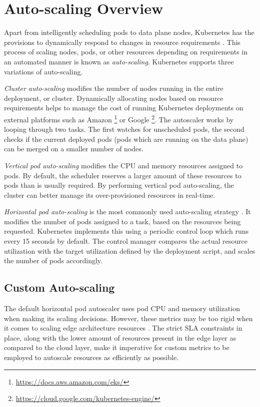 \section{Auto-scaling Overview}
\label{sec:ch2-auto-scaling}

Apart from intelligently scheduling pods to data plane nodes, Kubernetes has the provisions to dynamically respond to changes in resource requirements \cite{kayal2020kubernetes}. This process of scaling nodes, pods, or other resources depending on requirements in an automated manner is known as \textit{auto-scaling}. Kubernetes supports three variations of auto-scaling.\par

\textit{Cluster auto-scaling} modifies the number of nodes running in the entire deployment, or cluster. Dynamically allocating nodes based on resource requirements helps to manage the cost of running Kubernetes deployments on external platforms such as Amazon \footnote{\url{https://docs.aws.amazon.com/eks/}} or Google \footnote{\url{https://cloud.google.com/kubernetes-engine/}}. The autoscaler works by looping through two tasks. The first watches for unscheduled pods, the second checks if the current deployed pods (pods which are running on the data plane) can be merged on a smaller number of nodes.\par

\textit{Vertical pod auto-scaling} modifies the CPU and memory resources assigned to pods. By default, the scheduler reserves a larger amount of these resources to pods than is usually required. By performing vertical pod auto-scaling, the cluster can better manage its over-provisioned resources in real-time.\par

\textit{Horizontal pod auto-scaling} is the most commonly used auto-scaling strategy \cite{baresi2021kosmos}. It modifies the number of pods assigned to a task, based on the resources being requested. Kubernetes implements this using a periodic control loop which runs every 15 seconds by default. The control manager compares the actual resource utilization with the target utilization defined by the deployment script, and scales the number of pods accordingly.

\subsection{Custom Auto-scaling}
\label{subsec:ch2-custom-auto-scaling}

The default horizontal pod autoscaler uses pod CPU and memory utilization when making its scaling decisions. However, these metrics may be too rigid when it comes to scaling edge architecture resources \cite{coulson2020adaptive}. The strict SLA constraints in place, along with the lower amount of resources present in the edge layer as compared to the cloud layer, make it imperative for custom metrics to be employed to autoscale resources as efficiently as possible.\par

